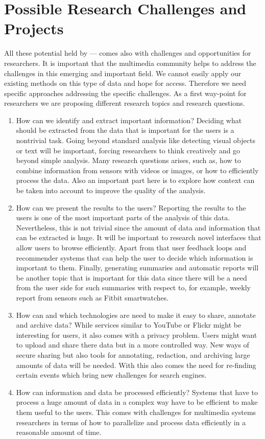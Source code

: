 \section{Possible Research Challenges and Projects}
All these potential held by --- comes also with challenges and opportunities for researchers.
It is important that the multimedia community helps to address the challenges in this emerging and important field. 
We cannot easily apply our existing methods on this type of data and hope for access. Therefore we need specific
approaches addressing the specific challenges.
As a first way-point for researchers we are proposing different research topics and research questions.
\begin{enumerate}
	\item How can we identify and extract important information? Deciding what should be extracted from the data that is important for the users is a nontrivial task. Going beyond standard analysis like detecting visual objects or text will be important, forcing researchers to think creatively and go beyond simple analysis. Many research questions arises, such as, how to combine information from sensors with videos or images, or how to efficiently process the data. Also an important part here is to explore how context can be taken into account to improve the quality of the analysis.
	
	\item How can we present the results to the users? 
	Reporting the results to the users is one of the most important parts of the analysis of this data. Nevertheless, this is not trivial since the amount of data and information that can be extracted is huge. It will be important to research novel interfaces that allow users to browse efficiently. Apart from that user feedback loops and recommender systems that can help the user to decide which information is important to them. Finally, generating summaries and automatic reports will be another topic that is important for this data since there will be a need from the user side for such summaries with respect to, for example, weekly report from sensors such as Fitbit smartwatches.
	
	\item How can and which technologies are need to make it easy to share, annotate and archive data? 
	While services similar to YouTube or Flickr might be interesting for users, it also comes with a privacy problem. Users might want to upload and share there data but in a more controlled way. New ways of secure sharing but also tools for annotating, redaction, and archiving large amounts of data will be needed. With this also comes the need for re-finding certain events which bring new challenges for search engines.  
	
	\item How can information and data be processed efficiently? Systems that have to process a huge amount of data in a complex way have to be efficient to make them useful to the users. This comes with challenges for multimedia systems researchers in terms of how to parallelize and process data efficiently in a reasonable amount of time.
\end{enumerate}


